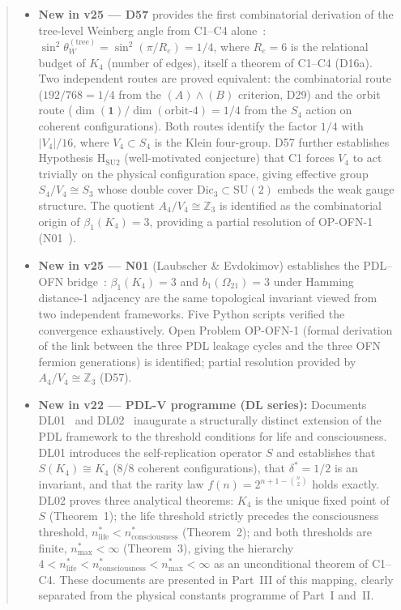 \documentclass[11pt,a4paper]{article}
\theoremstyle{plain}
\theoremstyle{definition}
\theoremstyle{remark}
\newcommand{\Kfour}{K_4}
\begin{document}
\begin{abstract}
\begin{itemize}
\item \textbf{New in v25 --- D57} provides the first combinatorial derivation of the tree-level Weinberg angle from C1--C4 alone~\cite{D57}: $\sin^2\theta_W^{(\mathrm{tree})} = \sin^2(\pi/R_e) = 1/4$, where $R_e = 6$ is the relational budget of $\Kfour$ (number of edges), itself a theorem of C1--C4 (D16a). Two independent routes are proved equivalent: the combinatorial route ($192/768 = 1/4$ from the $(A)\wedge(B)$ criterion, D29) and the orbit route ($\dim(\mathbf{1})/\dim(\text{orbit-4}) = 1/4$ from the $S_4$ action on coherent configurations). Both routes identify the factor $1/4$ with $|V_4|/16$, where $V_4 \subset S_4$ is the Klein four-group. D57 further establishes Hypothesis H$_{\mathrm{SU2}}$ (well-motivated conjecture) that C1 forces $V_4$ to act trivially on the physical configuration space, giving effective group $S_4/V_4 \cong S_3$ whose double cover $\mathrm{Dic}_3 \subset \mathrm{SU}(2)$ embeds the weak gauge structure. The quotient $A_4/V_4 \cong \mathbb{Z}_3$ is identified as the combinatorial origin of $\beta_1(K_4) = 3$, providing a partial resolution of OP-OFN-1 (N01~\cite{N01}).
\item \textbf{New in v25 --- N01} (Laubscher \& Evdokimov) establishes the PDL--OFN bridge~\cite{N01}: $\beta_1(\Kfour)=3$ and $b_1(\Omega_{21})=3$ under Hamming distance-1 adjacency are the same topological invariant viewed from two independent frameworks. Five Python scripts verified the convergence exhaustively. Open Problem OP-OFN-1 (formal derivation of the link between the three PDL leakage cycles and the three OFN fermion generations) is identified; partial resolution provided by $A_4/V_4 \cong \mathbb{Z}_3$ (D57).
\item \textbf{New in v22 --- PDL-V programme (DL series):} Documents DL01~\cite{DL01} and DL02~\cite{DL02} inaugurate a structurally distinct extension of the PDL framework to the threshold conditions for life and consciousness. DL01 introduces the self-replication operator $S$ and establishes that $S(K_4) \cong K_4$ (8/8 coherent configurations), that $\delta^* = 1/2$ is an invariant, and that the rarity law $f(n) = 2^{n+1-\binom{n}{2}}$ holds exactly. DL02 proves three analytical theorems: $K_4$ is the unique fixed point of $S$ (Theorem~1); the life threshold strictly precedes the consciousness threshold, $n^*_{\mathrm{life}} < n^*_{\mathrm{consciousness}}$ (Theorem~2); and both thresholds are finite, $n^*_{\mathrm{max}} < \infty$ (Theorem~3), giving the hierarchy $4 < n^*_{\mathrm{life}} < n^*_{\mathrm{consciousness}} < n^*_{\mathrm{max}} < \infty$ as an unconditional theorem of C1--C4. These documents are presented in Part~III of this mapping, clearly separated from the physical constants programme of Part~I and~II.

\end{itemize}
\end{abstract}
\end{document}

